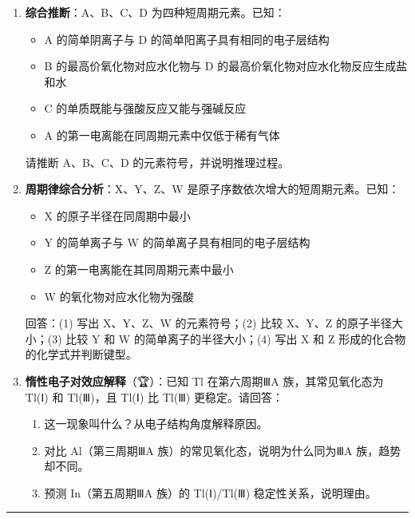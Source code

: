 \documentclass[a4paper,11pt]{ctexart}
\providecommand{\tightlist}{\setlength{\itemsep}{0pt}\setlength{\parskip}{0pt}}
\begin{document}
\begin{enumerate}
\def\labelenumi{\arabic{enumi}.}
\setcounter{enumi}{6}
\item
  \textbf{综合推断}：A、B、C、D 为四种短周期元素。已知：

  \begin{itemize}
  \tightlist
  \item
    A 的简单阴离子与 D 的简单阳离子具有相同的电子层结构
  \item
    B 的最高价氧化物对应水化物与 D 的最高价氧化物对应水化物反应生成盐和水
  \item
    C 的单质既能与强酸反应又能与强碱反应
  \item
    A 的第一电离能在同周期元素中仅低于稀有气体
  \end{itemize}

  请推断 A、B、C、D 的元素符号，并说明推理过程。
\item
  \textbf{周期律综合分析}：X、Y、Z、W 是原子序数依次增大的短周期元素。已知：

  \begin{itemize}
  \tightlist
  \item
    X 的原子半径在同周期中最小
  \item
    Y 的简单离子与 W 的简单离子具有相同的电子层结构
  \item
    Z 的第一电离能在其同周期元素中最小
  \item
    W 的氧化物对应水化物为强酸
  \end{itemize}

  回答：(1) 写出 X、Y、Z、W 的元素符号；(2) 比较 X、Y、Z 的原子半径大小；(3) 比较 Y 和 W 的简单离子的半径大小；(4) 写出 X 和 Z 形成的化合物的化学式并判断键型。
\item
  \textbf{惰性电子对效应解释}（🏆）：已知 Tl 在第六周期ⅢA 族，其常见氧化态为 Tl(Ⅰ) 和 Tl(Ⅲ)，且 Tl(Ⅰ) 比 Tl(Ⅲ) 更稳定。请回答：

  \begin{enumerate}
  \def\labelenumii{(\arabic{enumii})}
  \tightlist
  \item
    这一现象叫什么？从电子结构角度解释原因。
  \item
    对比 Al（第三周期ⅢA 族）的常见氧化态，说明为什么同为ⅢA 族，趋势却不同。
  \item
    预测 In（第五周期ⅢA 族）的 Tl(Ⅰ)/Tl(Ⅲ) 稳定性关系，说明理由。
  \end{enumerate}
\end{enumerate}

\begin{center}\rule{0.5\linewidth}{0.5pt}\end{center}
\end{document}
